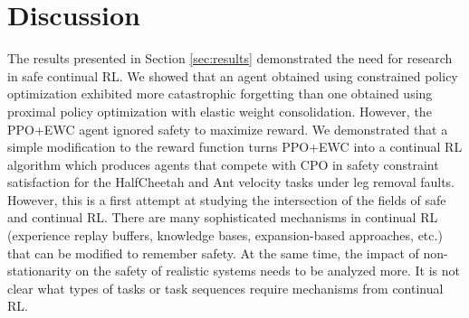 \section{Discussion} \label{sec:discussion}

The results presented in Section \ref{sec:results} demonstrated the need for research in safe continual RL. We showed that an agent obtained using constrained policy optimization exhibited more catastrophic forgetting than one obtained using proximal policy optimization with elastic weight consolidation. However, the PPO+EWC agent ignored safety to maximize reward. We demonstrated that a simple modification to the reward function turns PPO+EWC into a continual RL algorithm which produces agents that compete with CPO in safety constraint satisfaction for the HalfCheetah and Ant velocity tasks under leg removal faults. However, this is a first attempt at studying the intersection of the fields of safe and continual RL. There are many sophisticated mechanisms in continual RL (experience replay buffers, knowledge bases, expansion-based approaches, etc.) that can be modified to remember safety. At the same time, the impact of non-stationarity on the safety of realistic systems needs to be analyzed more. It is not clear what types of tasks or task sequences require mechanisms from continual RL. 